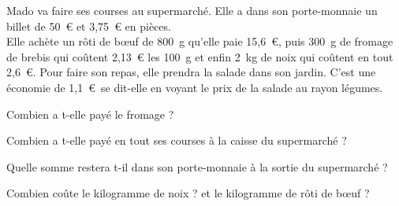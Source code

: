 Mado va faire ses courses au supermarché. Elle a dans son
porte-monnaie un billet de 50~\textgreek{\euro} et
3,75~\textgreek{\euro} en pièces.
\\Elle achète un rôti de b\oe uf de 800~g qu'elle paie
15,6~\textgreek{\euro}, puis 300~g de fromage de brebis qui coûtent
2,13~\textgreek{\euro} les 100~g et enfin 2~kg de noix qui coûtent en
tout 2,6~\textgreek{\euro}. Pour faire son repas, elle prendra la
salade dans son jardin. \og C'est une économie de
1,1~\textgreek{\euro}\fg\ se dit-elle en voyant le prix de la salade
au rayon \og légumes\fg.
\begin{myenumerate}
\item Combien a t-elle payé le fromage ?
\item Combien a t-elle payé en tout ses courses à la caisse du supermarché ?
\item Quelle somme restera t-il dans son porte-monnaie à la sortie du
supermarché ?
\item Combien coûte le kilogramme de noix ? et le kilogramme de rôti
de b\oe uf ?
\end{myenumerate}
